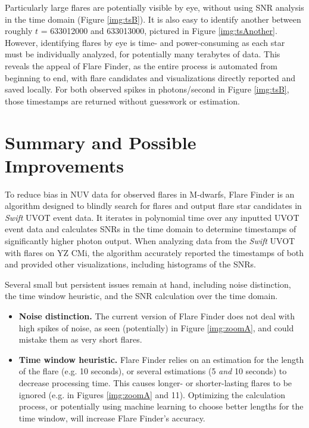 \documentclass{article}
\begin{document}
\begin{multicols}{2}

Particularly large flares are potentially visible by eye, without using SNR analysis in the time domain (Figure \ref{img:tsB}). It is also easy to identify another between roughly $t$ = 633012000 and 633013000, pictured in Figure \ref{img:tsAnother}. However, identifying flares by eye is time- and power-consuming as each star must be individually analyzed, for potentially many terabytes of data. This reveals the appeal of Flare Finder, as the entire process is automated from beginning to end, with flare candidates and visualizations directly reported and saved locally. For both observed spikes in photons/second in Figure \ref{img:tsB}, those timestamps are returned without guesswork or estimation. 

\section{Summary and Possible Improvements}

To reduce bias in NUV data for observed flares in M-dwarfs, Flare Finder is an algorithm designed to blindly search for flares and output flare star candidates in \textit{Swift} UVOT event data. It iterates in polynomial time over any inputted UVOT event data and calculates SNRs in the time domain to determine timestamps of significantly higher photon output. When analyzing data from the \textit{Swift} UVOT with flares on YZ CMi, the algorithm accurately reported the timestamps of both and provided other visualizations, including histograms of the SNRs. 

Several small but persistent issues remain at hand, including noise distinction, the time window heuristic, and the SNR calculation over the time domain.
\begin{itemize}

\item \textbf{Noise distinction.} The current version of Flare Finder does not deal with high spikes of noise, as seen (potentially) in Figure \ref{img:zoomA}, and could mistake them as very short flares. 

\item  \textbf{Time window heuristic.} Flare Finder relies on an estimation for the length of the flare (e.g. 10 seconds), or several estimations (5 \textit{and} 10 seconds) to decrease processing time. This causes longer- or shorter-lasting flares to be ignored (e.g. in Figures \ref{img:zoomA} and 11). Optimizing the calculation process, or potentially using machine learning to choose better lengths for the time window, will increase Flare Finder's accuracy.


\end{itemize}
\end{multicols}
\end{document}
